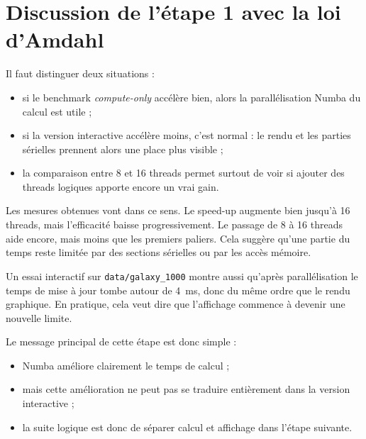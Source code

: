 \section{Discussion de l'étape 1 avec la loi d'Amdahl}

Il faut distinguer deux situations :
\begin{itemize}
    \item si le benchmark \textit{compute-only} accélère bien, alors la parallélisation Numba du calcul est utile ;
    \item si la version interactive accélère moins, c'est normal : le rendu et les parties sérielles prennent alors une place plus visible ;
    \item la comparaison entre 8 et 16 threads permet surtout de voir si ajouter des threads logiques apporte encore un vrai gain.
\end{itemize}

Les mesures obtenues vont dans ce sens. Le speed-up augmente bien jusqu'à 16 threads, mais l'efficacité baisse progressivement. Le passage de 8 à 16 threads aide encore, mais moins que les premiers paliers. Cela suggère qu'une partie du temps reste limitée par des sections sérielles ou par les accès mémoire.

Un essai interactif sur \texttt{data/galaxy\_1000} montre aussi qu'après parallélisation le temps de mise à jour tombe autour de \SI{4}{ms}, donc du même ordre que le rendu graphique. En pratique, cela veut dire que l'affichage commence à devenir une nouvelle limite.

Le message principal de cette étape est donc simple :
\begin{itemize}
    \item Numba améliore clairement le temps de calcul ;
    \item mais cette amélioration ne peut pas se traduire entièrement dans la version interactive ;
    \item la suite logique est donc de séparer calcul et affichage dans l'étape suivante.
\end{itemize}
